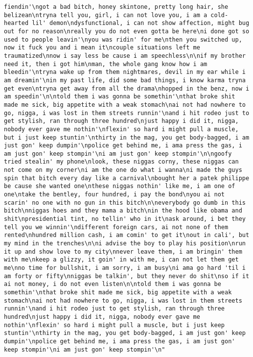 \documentclass[]{article}
\begin{document}
\begin{verbatim}
fiendin'\ngot a bad bitch, honey skintone, pretty long hair, she belizean\ntryna tell you, girl, i can not love you, i am a cold-hearted lil' demon\ndysfunctional, i can not show affection, might bug out for no reason\nreally you do not even gotta be here\ni done got so used to people leavin'\nyou was ridin' for me\nthen you switched up, now it fuck you and i mean it\ncouple situations left me traumatized\nnow i say less be cause i am speechless\n\nif my brother need it, then i got him\nman, the whole gang know how i am bleedin'\ntryna wake up from them nightmares, devil in my ear while i am dreamin'\nin my past life, did some bad things, i know karma tryna get even\ntryna get away from all the drama\nhopped in the benz, now i am speedin'\n\ntold them i was gonna be somethin'\nthat broke shit made me sick, big appetite with a weak stomach\nai not had nowhere to go, nigga, i was lost in them streets runnin'\nand i hit rodeo just to get stylish, ran through three hundred\njust happy i did it, nigga, nobody ever gave me nothin'\nflexin' so hard i might pull a muscle, but i just keep stuntin'\nthirty in the mag, you get body-bagged, i am just gon' keep dumpin'\npolice get behind me, i ama press the gas, i am just gon' keep stompin'\ni am just gon' keep stompin'\n\ngoofy tried stealin' my phone\nlook, these niggas corny, these niggas can not come on my corner\ni am the one do what i wanna\ni made the guys spin that bitch every day like a carnival\nbought her a patek philippe be cause she wanted one\nthese niggas nothin' like me, i am one of one\ntake the bentley, four hundred, i pay the bond\nyou ai not scarin' no one with no gun in this bitch\n\neverybody go dumb in this bitch\nniggas hoes and they mama a bitch\nin the hood like obama and shit\npresidential tint, no tellin' who in it\nask around, i bet they tell you we winnin'\ndifferent foreign cars, ai not none of them rented\nhundred million cash, i am comin' to get it\nout in cali', but my mind in the trenches\n\ni advise the boy to play his position\nrun it up and show love to my city\nnever leave them, i am bringin' them with me\nkeep a glizzy, it goin' in with me, i can not let them get me\nno time for bullshit, i am sorry, i am busy\ni ama go hard 'til i am forty or fifty\nniggas be talkin', but they never do shit\nso if it ai not money, i do not even listen\n\ntold them i was gonna be somethin'\nthat broke shit made me sick, big appetite with a weak stomach\nai not had nowhere to go, nigga, i was lost in them streets runnin'\nand i hit rodeo just to get stylish, ran through three hundred\njust happy i did it, nigga, nobody ever gave me nothin'\nflexin' so hard i might pull a muscle, but i just keep stuntin'\nthirty in the mag, you get body-bagged, i am just gon' keep dumpin'\npolice get behind me, i ama press the gas, i am just gon' keep stompin'\ni am just gon' keep stompin'\n"

\end{verbatim}
\end{document}
